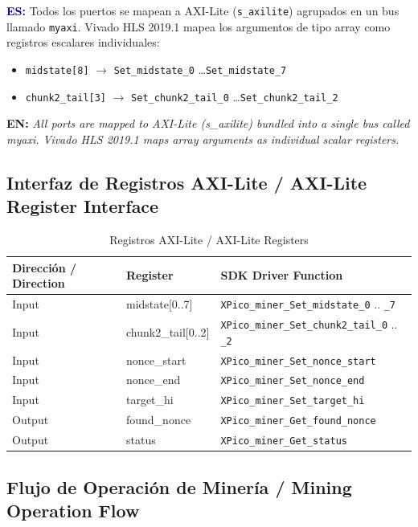 \documentclass[12pt,a4paper]{article}
\newcommand{\es}[1]{\foreignlanguage{spanish}{#1}}
\newcommand{\en}[1]{\foreignlanguage{english}{#1}}
\newcommand{\bsubsection}[2]{%
    \subsection{#1 \textnormal{\small\color{accentblue}/ #2}}%
}
\newenvironment{bilingual}{%
    \par\medskip
}{%
    \par\medskip
}
\newcommand{\espara}[1]{\noindent\textcolor{darkblue}{\textbf{ES:}} #1\par\smallskip}
\newcommand{\enpara}[1]{\noindent\textcolor{accentblue}{\textbf{EN:}} \textit{#1}\par\smallskip}
\begin{document}
\begin{bilingual}
\espara{%
Todos los puertos se mapean a AXI-Lite (\texttt{s\_axilite}) agrupados en un
bus llamado \texttt{myaxi}. Vivado HLS 2019.1 mapea los argumentos de tipo array
como registros escalares individuales:
\begin{itemize}[leftmargin=2em]
    \item \texttt{midstate[8]} $\rightarrow$ \texttt{Set\_midstate\_0} \ldots \texttt{Set\_midstate\_7}
    \item \texttt{chunk2\_tail[3]} $\rightarrow$ \texttt{Set\_chunk2\_tail\_0} \ldots \texttt{Set\_chunk2\_tail\_2}
\end{itemize}}

\enpara{%
All ports are mapped to AXI-Lite (s\_axilite) bundled into a single bus called
myaxi. Vivado HLS 2019.1 maps array arguments as individual scalar registers.}
\end{bilingual}

\bsubsection{Interfaz de Registros AXI-Lite}{AXI-Lite Register Interface}

\begin{table}[h]
    \centering
    \caption{\es{Registros AXI-Lite} / \en{AXI-Lite Registers}}
    \begin{tabular}{@{}lll@{}}
        \toprule
        \textbf{\es{Direcci\'on} / \en{Direction}} & \textbf{Register} & \textbf{SDK Driver Function} \\
        \midrule
        Input  & midstate[0..7]     & \texttt{XPico\_miner\_Set\_midstate\_0} .. \texttt{\_7} \\
        Input  & chunk2\_tail[0..2] & \texttt{XPico\_miner\_Set\_chunk2\_tail\_0} .. \texttt{\_2} \\
        Input  & nonce\_start       & \texttt{XPico\_miner\_Set\_nonce\_start} \\
        Input  & nonce\_end         & \texttt{XPico\_miner\_Set\_nonce\_end} \\
        Input  & target\_hi         & \texttt{XPico\_miner\_Set\_target\_hi} \\
        Output & found\_nonce       & \texttt{XPico\_miner\_Get\_found\_nonce} \\
        Output & status             & \texttt{XPico\_miner\_Get\_status} \\
        \bottomrule
    \end{tabular}
\end{table}

\bsubsection{Flujo de Operaci\'on de Miner\'ia}{Mining Operation Flow}
\end{document}
